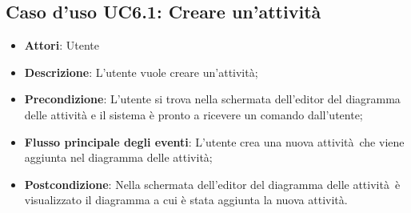 \documentclass[../AnalisiDeiRequisiti.tex]{subfiles}
\begin{document}
				\subsection{Caso d'uso UC6.1: Creare un'attività}
				\begin{itemize}
					\item \textbf{Attori}: Utente
					\item \textbf{Descrizione}: L'utente vuole creare un'attività;
					\item \textbf{Precondizione}: L'utente si trova nella schermata dell'editor del diagramma delle attività e il sistema è pronto a ricevere un comando dall'utente;
					\item \textbf{Flusso principale degli eventi}: L'utente crea una nuova attività che viene aggiunta nel diagramma delle attività;
					\item \textbf{Postcondizione}: Nella schermata dell'editor del diagramma delle attività è visualizzato il diagramma a cui è stata aggiunta la nuova attività.
				\end{itemize}
\end{document}
